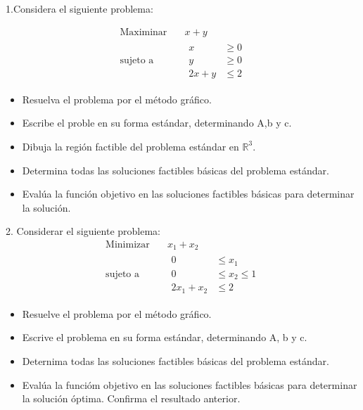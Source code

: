 \documentclass{article}
\begin{document}
1.Considera el siguiente problema:

\begin{equation*}
  \begin{aligned}
    \text{Maximinar}\quad & x+y\\
    \text{sujeto a}\quad &
    \begin{aligned}
      x & \geq 0\\
      y & \geq 0\\
      2x+y & \leq 2
    \end{aligned}
  \end{aligned}
\end{equation*}
  \begin{itemize}
  \item Resuelva el problema por el método gráfico.
  \item Escribe el proble en su forma estándar, determinando A,b y c.
  \item Dibuja la región factible del problema estándar en $\mathbb{R}^{3}.$
  \item Determina todas las soluciones factibles básicas del problema estándar.
  \item Evalúa la función objetivo en las soluciones factibles básicas para determinar la solución.
  \end{itemize}


2. Considerar el siguiente problema:
\begin{equation*}
  \begin{aligned}
    \text{Minimizar}\quad & x_1+x_2\\
    \text{sujeto a}\quad &
    \begin{aligned}
      0 & \leq x_1\\
      0 & \leq x_2 \leq 1\\
      2x_1+x_2 & \leq 2
    \end{aligned}   
\end{aligned}
\end{equation*}
\begin{itemize}
  \item Resuelve el problema por el método gráfico.
  \item Escrive el problema en su forma estándar, determinando A, b y c.
  \item Deternima todas las soluciones factibles básicas del problema estándar.
  \item Evalúa la funcióm objetivo en las soluciones factibles básicas para determinar la solución óptima. Confirma el resultado anterior.
  \end{itemize}
  
\end{document}
